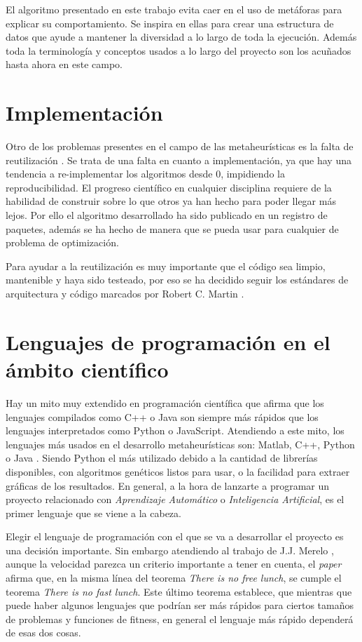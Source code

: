 El algoritmo presentado en este trabajo evita caer en el uso de metáforas para explicar su comportamiento. Se inspira en ellas para crear una estructura de datos que ayude 
a mantener la diversidad a lo largo de toda la ejecución. Además toda la terminología y conceptos usados a lo largo del proyecto son los acuñados hasta ahora en este campo.

\section{Implementación}

Otro de los problemas presentes en el campo de las metaheurísticas es la falta de reutilización \cite{metaheuristics}. Se trata de una falta en cuanto a implementación, ya que hay una
tendencia a re-implementar los algoritmos desde 0, impidiendo la reproducibilidad. El progreso científico en cualquier disciplina requiere de la habilidad de construir sobre lo que
otros ya han hecho para poder llegar más lejos. Por ello el algoritmo desarrollado ha sido publicado en un registro de paquetes, además se ha hecho de manera que se pueda usar para 
cualquier de problema de optimización. 

Para ayudar a la reutilización es muy importante que el código sea limpio, mantenible y haya sido testeado, por eso se ha decidido seguir los estándares de arquitectura y código marcados 
por Robert C. Martin \cite{cleanArquitecture2017, cleanCode2008}.

\section{Lenguajes de programación en el ámbito científico}

Hay un mito muy extendido en programación científica que afirma que los lenguajes compilados como C++ o Java son siempre más rápidos que los lenguajes interpretados como Python o 
JavaScript. Atendiendo a este mito, los lenguajes más usados en el desarrollo metaheurísticas son: Matlab, C++, Python o Java \cite{languages}. Siendo Python el más 
utilizado debido a la cantidad de librerías disponibles, con algoritmos genéticos listos para usar, o la facilidad para extraer gráficas de los resultados. En general, a 
la hora de lanzarte a programar un proyecto relacionado con \emph{Aprendizaje Automático} o \emph{Inteligencia Artificial}, es el primer lenguaje que se viene a la cabeza. 

Elegir el lenguaje de programación con el que se va a desarrollar el proyecto es una decisión importante. Sin embargo atendiendo al trabajo de J.J. Merelo \cite{fast_lunch}, aunque
la velocidad parezca un criterio importante a tener en cuenta, el \emph{paper} afirma que, en la misma línea del teorema \emph{There is no free lunch}, se cumple el teorema
\emph{There is no fast lunch}. Este último teorema establece, que mientras que puede haber algunos lenguajes que podrían ser más rápidos para ciertos tamaños de problemas y 
funciones de fitness, en general el lenguaje más rápido dependerá de esas dos cosas.

